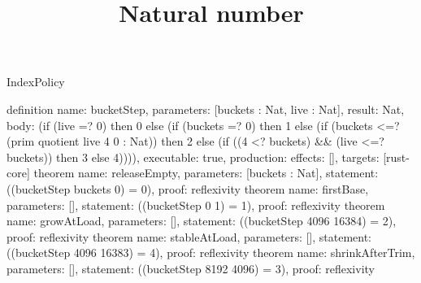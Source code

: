 \begin{lexlean}{IndexPolicy}
\title{Natural number}
\begin{semanticmodule}
definition{
  name: bucketStep, parameters: [buckets : Nat, live : Nat], result: Nat,
  body: (if (live =? 0) then 0 else
         (if (buckets =? 0) then 1 else
          (if (buckets <=? (prim quotient live 4 0 : Nat)) then 2 else
           (if ((4 <? buckets) && (live <=? buckets)) then 3 else 4)))),
  executable: true, production: {effects: [], targets: [rust-core]}
}
theorem{ name: releaseEmpty, parameters: [buckets : Nat], statement: ((bucketStep buckets 0) = 0), proof: reflexivity{} }
theorem{ name: firstBase, parameters: [], statement: ((bucketStep 0 1) = 1), proof: reflexivity{} }
theorem{ name: growAtLoad, parameters: [], statement: ((bucketStep 4096 16384) = 2), proof: reflexivity{} }
theorem{ name: stableAtLoad, parameters: [], statement: ((bucketStep 4096 16383) = 4), proof: reflexivity{} }
theorem{ name: shrinkAfterTrim, parameters: [], statement: ((bucketStep 8192 4096) = 3), proof: reflexivity{} }
\end{semanticmodule}
\end{lexlean}
